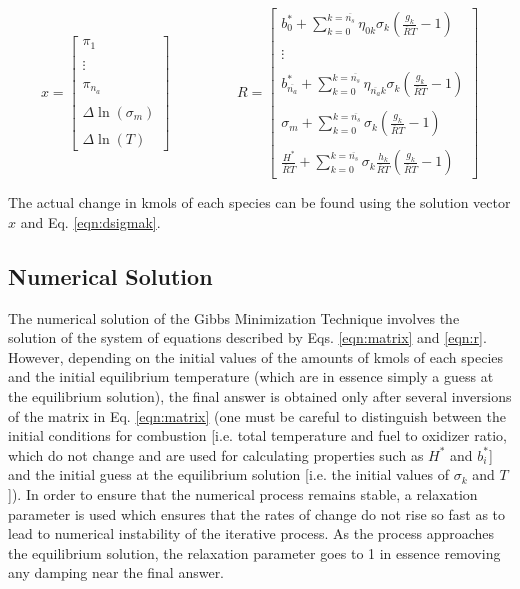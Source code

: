 \begin{equation}
	x = \left[ 
	\begin{array}{c}
		\pi_1 \\ \\
		\vdots \\ \\
		\pi_{n_a} \\ \\
		\Delta \ln(\sigma_m) \\ \\
		\Delta \ln(T) 	
	\end{array} \right] \hspace{2cm}
	R = \left[ 
	\begin{array}{c}
		b_0^* + \sum_{k=0}^{k=\overline{n_s}}\eta_{0k}\sigma_k(\frac{g_k}{\overline{R}T} - 1) \\ \\
		\vdots \\ \\
		b_{\overline{n_a}}^* + \sum_{k=0}^{k=\overline{n_s}}\eta_{\overline{n_a}k}\sigma_k
		(\frac{g_k}{\overline{R}T} - 1) \\ \\
		\sigma_m + \sum_{k=0}^{k=\overline{n_s}}\sigma_k(\frac{g_k}{\overline{R}T} - 1) \\ \\
		\frac{H^*}{\overline{R}T} + \sum_{k=0}^{k=\overline{n_s}}\sigma_k\frac{h_k}{\overline{R}T}
		(\frac{g_k}{\overline{R}T} - 1)
	\end{array} \right]
\label{eqn:r}
\end{equation}

	The actual change in kmols of each species can be found using the solution 
vector $x$ and Eq. \ref{eqn:dsigmak}.

\subsection{Numerical Solution}

	The numerical solution of the Gibbs Minimization Technique involves the solution of the 
system of equations described by Eqs. \ref{eqn:matrix} and \ref{eqn:r}.  However, depending on the 
initial values of the amounts of kmols of each species and the initial equilibrium temperature
(which are in essence simply a guess at the equilibrium solution), the final answer is obtained 
only after several inversions of the matrix in Eq. \ref{eqn:matrix} (one must be careful to 
distinguish between the initial conditions for combustion [i.e. total temperature and 
fuel to oxidizer ratio, which do not change and are used for calculating properties such
as $H^*$ and $b_i^*$] and the initial guess at the equilibrium solution [i.e. the initial 
values of $\sigma_k$ and $T$]).  In order to ensure that the numerical process remains stable,
a relaxation parameter is used which ensures that the rates of change do not rise so fast as to 
lead to numerical instability of the iterative process.  As the process approaches the equilibrium
solution, the relaxation parameter goes to 1 in essence removing any damping near the final answer.

